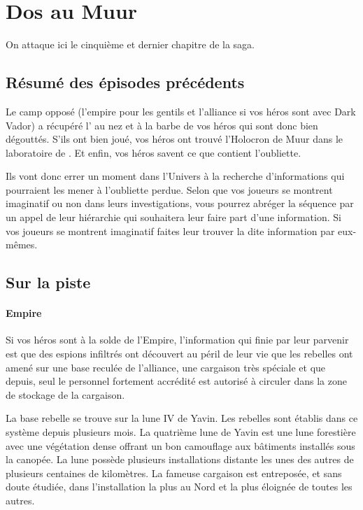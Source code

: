 \section{Dos au Muur}
On attaque ici le cinquième et dernier chapitre de la saga.

\subsection{Résumé des épisodes précédents}
Le camp opposé (l’empire pour les gentils et l’alliance si vos héros sont avec Dark Vador) a récupéré l’ au nez et à la barbe de vos héros qui sont donc bien dégouttés. S’ils ont bien joué, vos héros ont trouvé l’Holocron de Muur dans le laboratoire de . Et enfin, vos héros savent ce que contient l’oubliette.

Ils vont donc errer un moment dans l’Univers à la recherche d’informations qui pourraient les mener à l’oubliette perdue. Selon que vos joueurs se montrent imaginatif ou non dans leurs investigations, vous pourrez abréger la séquence par un appel de leur hiérarchie qui souhaitera leur faire part d’une information. Si vos joueurs se montrent imaginatif faites leur trouver la dite information par eux-mêmes.

\subsection{Sur la piste}
\paragraph{Empire}
Si vos héros sont à la solde de l’Empire, l’information qui finie par leur parvenir est que des espions infiltrés ont découvert au péril de leur vie que les rebelles ont amené sur une base reculée de l’alliance, une cargaison très spéciale et que depuis, seul le personnel fortement accrédité est autorisé à circuler dans la zone de stockage de la cargaison.

La base rebelle se trouve sur la lune IV de Yavin. Les rebelles sont établis dans ce système depuis plusieurs mois. La quatrième lune de Yavin est une lune forestière avec une végétation dense offrant un bon camouflage aux bâtiments installés sous la canopée. La lune possède plusieurs installations distante les unes des autres de plusieurs centaines de kilomètres. La fameuse cargaison est entreposée, et sans doute étudiée, dans l’installation la plus au Nord et la plus éloignée de toutes les autres.

